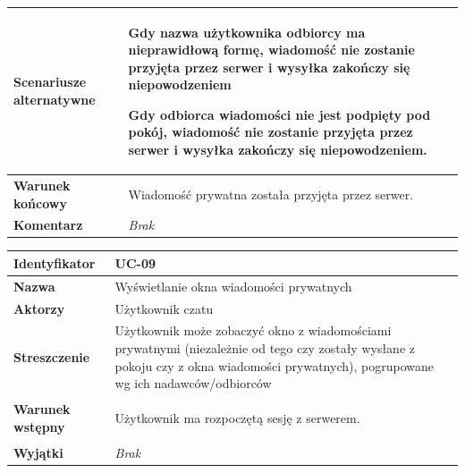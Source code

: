 {\begin{tabular}{ | l | l | }
	\hline
		\textbf{Scenariusze alternatywne} & \parbox[t]
		{11cm}{
			\begin{enumreq}
				\item Gdy nazwa użytkownika odbiorcy ma nieprawidłową formę, wiadomość
				nie zostanie przyjęta przez serwer i wysyłka zakończy się niepowodzeniem
				\item Gdy odbiorca wiadomości nie jest podpięty pod pokój, wiadomość nie
				zostanie przyjęta przez serwer i wysyłka zakończy się niepowodzeniem.
			\end{enumreq}
		}
		\\

	\hline
		\textbf{Warunek końcowy} & \parbox[t]{11cm}{
			Wiadomość prywatna została przyjęta przez serwer.
		}
		\\

	\hline
		\textbf{Komentarz} & \parbox[t]{11cm}{
			\textit{Brak}
		}
		\\

	\hline
\end{tabular}

\vspace{2em}

\begin{tabular}{ | l | l | }
	\hline
		\textbf{Identyfikator} &
		UC-09
		\\

	\hline
		\textbf{Nazwa} &
		Wyświetlanie okna wiadomości prywatnych
		\\

	\hline
		\textbf{Aktorzy} & \parbox[t]{11cm}{
			Użytkownik czatu
		}\\

	\hline
		\textbf{Streszczenie} & \parbox[t]{11cm}{
			Użytkownik może zobaczyć okno z wiadomościami prywatnymi (niezależnie od
			tego czy zostały wysłane z pokoju czy z okna wiadomości prywatnych),
			pogrupowane wg ich nadawców/odbiorców
		}\\

	\hline
		\textbf{Warunek wstępny} & \parbox[t]{11cm}{
			\begin{enumreq}
				\item Użytkownik ma rozpoczętą sesję z serwerem.
			\end{enumreq}

		}
		\\

	\hline
		\textbf{Wyjątki} & \parbox[t]{11cm}{
			\textit{Brak}

		}
		\\


\end{tabular}}
